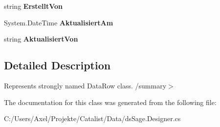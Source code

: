 \begin{DoxyCompactItemize}
\item 
string {\bfseries Erstellt\+Von}\hypertarget{class_products_1_1_data_1_1ds_sage_1_1_servicetermin_row_a2430799f21e39db06d79826678e47bc1}{}\label{class_products_1_1_data_1_1ds_sage_1_1_servicetermin_row_a2430799f21e39db06d79826678e47bc1}

\item 
System.\+Date\+Time {\bfseries Aktualisiert\+Am}\hypertarget{class_products_1_1_data_1_1ds_sage_1_1_servicetermin_row_a4431aa7be8f98a2904d9c4e439bc555b}{}\label{class_products_1_1_data_1_1ds_sage_1_1_servicetermin_row_a4431aa7be8f98a2904d9c4e439bc555b}

\item 
string {\bfseries Aktualisiert\+Von}\hypertarget{class_products_1_1_data_1_1ds_sage_1_1_servicetermin_row_a61ce7a32012c8ad32b4bbdb1036942c4}{}\label{class_products_1_1_data_1_1ds_sage_1_1_servicetermin_row_a61ce7a32012c8ad32b4bbdb1036942c4}

\end{DoxyCompactItemize}


\subsection{Detailed Description}
Represents strongly named Data\+Row class. /summary$>$ 

The documentation for this class was generated from the following file\+:\begin{DoxyCompactItemize}
\item 
C\+:/\+Users/\+Axel/\+Projekte/\+Catalist/\+Data/ds\+Sage.\+Designer.\+cs\end{DoxyCompactItemize}
